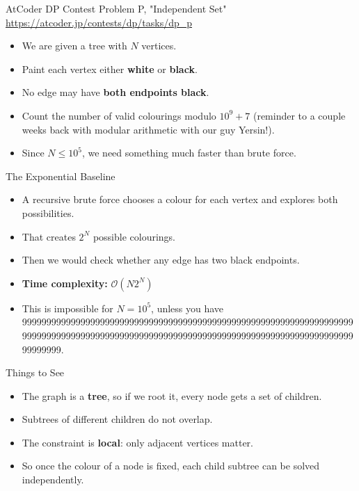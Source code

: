\documentclass{beamer}
\begin{document}
\begin{frame}{AtCoder DP Contest Problem P, "Independent Set"}
    \href{https://atcoder.jp/contests/dp/tasks/dp_p}{https://atcoder.jp/contests/dp/tasks/dp\_p}
    \begin{itemize}
        \item We are given a tree with \(N\) vertices.
        \item Paint each vertex either \textbf{white} or \textbf{black}.
        \item No edge may have \textbf{both endpoints black}.
        \item Count the number of valid colourings modulo \(10^9+7\) (reminder to a couple weeks back with modular arithmetic with our guy Yersin!).
        \item Since \(N \le 10^5\), we need something much faster than brute force.
    \end{itemize}
\end{frame}

\begin{frame}{The Exponential Baseline}
    \begin{itemize}
        \item A recursive brute force chooses a colour for each vertex and explores both possibilities.
        \item That creates \(2^N\) possible colourings.
        \item Then we would check whether any edge has two black endpoints.
        \item \textbf{Time complexity:} \(\mathcal{O}(N 2^N)\)
        \item This is impossible for \(N = 10^5\), unless you have 999999999999999999999999999999999999999999999999999999999999999999999999999999999999999999999999999999999999999999999999999999999999999999999999.
    \end{itemize}
\end{frame}

\begin{frame}{Things to See}
    \begin{itemize}
        \item The graph is a \textbf{tree}, so if we root it, every node gets a set of children.
        \item Subtrees of different children do not overlap.
        \item The constraint is \textbf{local}: only adjacent vertices matter.
        \item So once the colour of a node is fixed, each child subtree can be solved independently.
    \end{itemize}
\end{frame}
\end{document}
